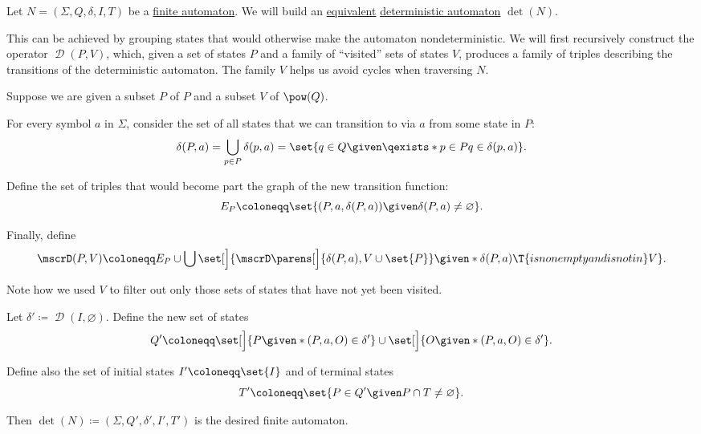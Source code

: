 \begin{algorithm}\label{alg:determinization_of_finite_automata}
  Let \( N = (\Sigma, Q, \delta, I, T) \) be a \hyperref[def:finite_automaton]{finite automaton}. We will build an \hyperref[def:finite_automaton/equivalent]{equivalent} \hyperref[def:finite_automaton/determinism]{deterministic automaton} \( \det(N) \).

  This can be achieved by grouping states that would otherwise make the automaton nondeterministic. We will first recursively construct the operator \( \mscrD(P, V) \), which, given a set of states \( P \) and a family of \enquote{visited} sets of states \( V \), produces a family of triples describing the transitions of the deterministic automaton. The family \( V \) helps us avoid cycles when traversing \( N \).

  \begin{thmenum}
     Suppose we are given a subset \( P \) of \( P \) and a subset \( V \) of \( \pow(Q) \).

    For every symbol \( a \) in \( \Sigma \), consider the set of all states that we can transition to via \( a \) from some state in \( P \):
    \begin{equation*}
      \delta(P, a) = \bigcup_{p \in P} \delta(p, a) = \set{ q \in Q \given \qexists* {p \in P} q \in \delta(p, a) }.
    \end{equation*}

    Define the set of triples that would become part the graph of the new transition function:
    \begin{equation*}
      E_P \coloneqq \set{ (P, a, \delta(P, a)) \given \delta(P, a) \neq \varnothing }.
    \end{equation*}

    Finally, define
    \begin{equation*}
      \mscrD(P, V) \coloneqq E_P \cup \bigcup \set[\Big]{ \mscrD\parens[\Big]{ \delta(P, a), V \cup \set{ P } } \given* \delta(P, a) \T{is nonempty and is not in} V }.
    \end{equation*}

    Note how we used \( V \) to filter out only those sets of states that have not yet been visited.

     Let \( \delta' \coloneqq \mscrD(I, \varnothing) \). Define the new set of states
    \begin{equation*}
      Q' \coloneqq \set[\Big]{ P \given* (P, a, O) \in \delta' } \cup \set[\Big]{ O \given* (P, a, O) \in \delta' }.
    \end{equation*}

    Define also the set of initial states \( I' \coloneqq \set{ I } \) and of terminal states
    \begin{equation*}
      T' \coloneqq \set{ P \in Q' \given P \cap T \neq \varnothing }.
    \end{equation*}

    Then \( \det(N) \coloneqq (\Sigma, Q', \delta', I', T') \) is the desired finite automaton.
  \end{thmenum}
\end{algorithm}
